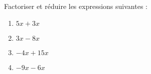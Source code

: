
\begin{exercice}\label{exo2smath-0107}

    Factoriser et réduire les expressions suivantes :
    \begin{multicols}{2}
        \begin{enumerate}
            \item
                \( 5x+3x\)
            \item
                \( 3x-8x\)
            \item
                \( -4x+15x\)
            \item
                \( -9x-6x\)
        \end{enumerate}
    \end{multicols}

\end{exercice}
